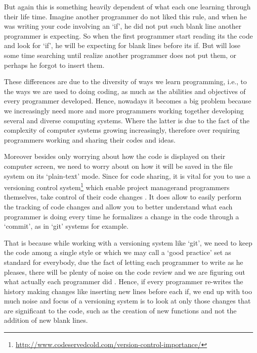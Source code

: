 \begin{englishtext}
    But again this is something heavily dependent of what each one learning
    through their life time. Imagine another programmer do not liked this rule,
    and when he was writing your code involving an `if', he did not put such
    blank line another programmer is expecting. So when the first programmer
    start reading its the code and look for `if', he will be expecting for blank
    lines before its if\s. But will lose some time searching until realize
    another programmer does not put them, or perhaps he forgot to insert them.
    \cite{quantifyingProgramComprehension}

    These differences are due to the diversity of ways we learn programming,
    i.e., to the ways we are used to doing coding, as much as the abilities and
    objectives of every programmer developed. Hence, nowadays it becomes a big
    problem because we increasingly need more and more programmers working
    together developing several and diverse computing systems. Where the latter
    is due to the fact of the complexity of computer systems growing
    increasingly, therefore over requiring programmers working and sharing their
    codes and ideas. \cite{howProgrammersRead}

    Moreover besides only worrying about how the code is displayed on their
    computer screen, we need to worry about on how it will be saved in the file
    system on its `plain-text' mode. Since for code sharing, it is vital for you
    to use a versioning control system\footnote{\url{http://www.codeservedcold.com/version-control-importance/}}
    which enable project manager\s and
    programmers themselves, take control of their code changes
    \cite{redesignOfGit}. It does allow to easily perform the tracking of code
    changes \cite{gettingProductive} and
    allow you to better understand what each programmer is doing
    every time he formalizes a change in the code through a `commit', as in
    `git' systems for example. \cite{usingSourceControl}

    That is because while working with a versioning system like `git', we need
    to keep the code among a single style or which we may call a `good practice'
    set as standard for everybody, due the fact of letting each programmer to
    write as he pleases, there will be plenty of noise on the code review and we
    are figuring out what actually each programmer did \cite{quitDiffCalculating}.
    Hence, if every programmer re-writes the history making changes
    like inserting new lines
    before each if, we end up with too much noise and focus of a versioning
    system is to look at only those changes that are significant to the code,
    such as the creation of new functions and not the addition of new blank
    lines. \cite{findingRegressionsInProjects}


\end{englishtext}
